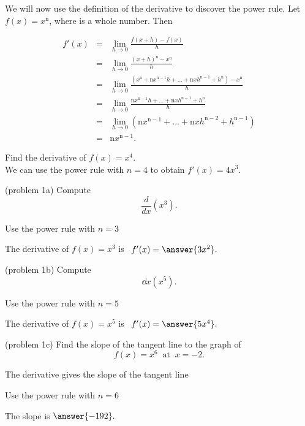 \documentclass{ximera}
\begin{document}
We will now use the definition of the derivative to discover the power rule. 
Let $f(x) = x^\text{n}$, where  is a whole number. Then

\begin{eqnarray*}
f'(x) &=& \lim_{h\to 0} \frac{f(x+h)-f(x)}{h}\\[10 pt] 
&=& \lim_{h\to 0} \frac{(x+h)^\text{n}-x^\text{n}}{h}\\[10 pt]
&=& \lim_{h\to 0} \frac{\left(x^\text{n} + \text{n}x^{\text{n}-1}h + \dots + \text{n}xh^{\text{n}-1} + h^\text{n}\right)-x^\text{n}}{h}\\[10 pt]
 &=& \lim_{h\to 0} \frac{\text{n}x^{\text{n}-1}h + \dots + \text{n}xh^{\text{n}-1} + h^\text{n}}{h} \\[10 pt]
 &=& \lim_{h\to 0} \left(\text{n}x^{\text{n}-1} + \dots + \text{n}xh^{\text{n}-2} + h^{\text{n}-1}\right) \\[10 pt] 
 &=& \text{n}x^{\text{n}-1}.
 \end{eqnarray*}




\begin{example}[example 1]
Find the derivative of  $f(x) = x^4$.\\
We can use the power rule with $n = 4$ to obtain $f'(x) = 4x^3.$
\end{example}



\begin{problem}(problem 1a)
Compute
\[
\frac{d}{dx} \left(x^3\right).
\]
\begin{hint}
Use the power rule with $n = 3$
\end{hint}
\begin{prompt}
The derivative of $f(x) = x^3$ is \ $f'(x) = \answer{3x^2}.$
\end{prompt}
\end{problem}



\begin{problem}(problem 1b)
Compute
\[
\dd{x} \left(x^5\right).
\]
\begin{hint}
Use the power rule with $n = 5$
\end{hint}
The derivative of $f(x) = x^5$ is \ $f'(x) = \answer{5x^4}.$
\end{problem}



\begin{problem}(problem 1c)
Find the slope of the tangent line to the graph of 
\[
f(x) = x^6  \;\; \text{at} \;\; x = -2.
\]
\begin{hint}
The derivative gives the slope of the tangent line
\end{hint}
\begin{hint}
Use the power rule with $n = 6$
\end{hint}
The slope is  $\answer{-192}.$
\end{problem}
\end{document}
